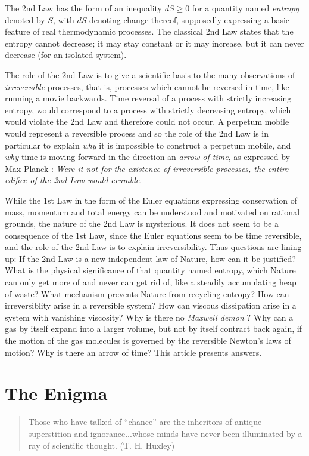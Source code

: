 The 2nd Law has the form of an inequality
$dS\ge 0$ for a quantity
named \emph{entropy} denoted by
$S$, with $dS$ denoting change thereof, supposedly
expressing a basic feature of real thermodynamic processes.
The classical 2nd Law states that the entropy cannot decrease;
it may stay constant or it may increase,
but it can never decrease (for an isolated system).

The role of the 2nd Law is
to give a scientific basis to the many observations
of \emph{irreversible} processes, that is, processes which cannot
be reversed in time, like running a movie backwards.
Time reversal of a
process with strictly increasing entropy, would correspond
to a process with strictly
decreasing entropy, which would violate the 2nd Law and therefore could
not occur. A perpetum mobile would represent a reversible
process and so the role of the 2nd Law is in particular to explain \emph{why}
it is impossible to construct a perpetum mobile, and
\emph{why} time is moving forward in the direction an
\emph{arrow of time}, as expressed by  Max Planck
\cite{planck1,planck2,planck3}: \emph{Were it not for the
existence of irreversible processes, the entire edifice
of the 2nd Law would crumble}.

While the 1st Law in the form of the Euler equations
expressing conservation of mass, momentum and total energy
can be understood and motivated on rational grounds,
the nature of the 2nd Law is mysterious.
It does not seem to be a consequence of the 1st Law, since the Euler
equations seem to be time reversible, and the role of the 2nd Law is to
explain irreversibility. Thus questions are lining up: If the 2nd Law is a new
independent law of
Nature, how can it be justified? What is the physical significance of that
quantity named entropy,
which Nature can only get more of and never can get rid of, like
a steadily accumulating heap of waste? What mechanism prevents Nature
from recycling entropy? How can irreversiblity arise in a
reversible system? How can viscous dissipation arise in a
system with vanishing viscosity? Why is there no \emph{Maxwell demon}
\cite{maxwell}?
Why can a gas by itself expand
into a larger volume, but not by itself contract back again,
if the motion of the gas molecules is governed by the reversible Newton's
laws of motion? Why is there an arrow of time? This article presents answers.



\section{The Enigma}
\small
\begin{quote}
Those who have talked of ``chance'' are the
inheritors of antique superstition and ignorance...whose minds have never
been illuminated by a ray of scientific thought. (T. H. Huxley)
\end{quote}
\normalsize



